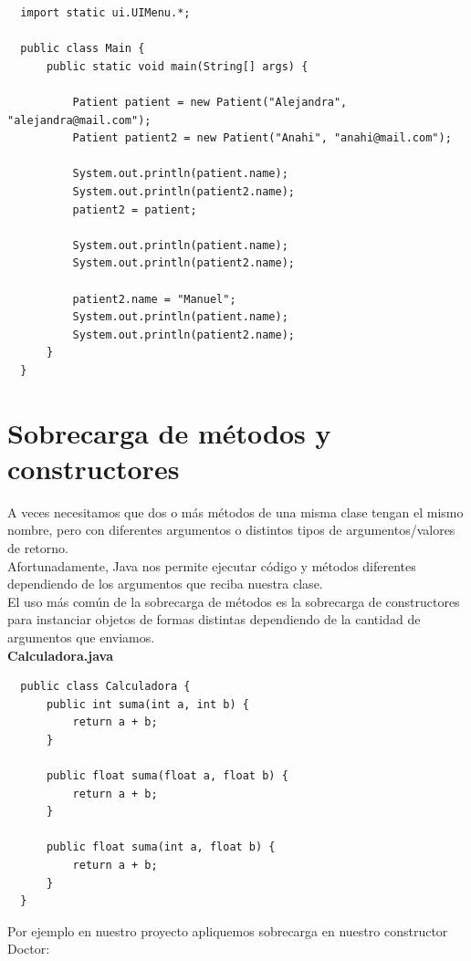 \documentclass{article}
\begin{document}
\begin{verbatim}
  import static ui.UIMenu.*;

  public class Main {
      public static void main(String[] args) {

          Patient patient = new Patient("Alejandra", "alejandra@mail.com");
          Patient patient2 = new Patient("Anahi", "anahi@mail.com");

          System.out.println(patient.name);
          System.out.println(patient2.name);
          patient2 = patient;

          System.out.println(patient.name);
          System.out.println(patient2.name);

          patient2.name = "Manuel";
          System.out.println(patient.name);
          System.out.println(patient2.name);
      }
  }
\end{verbatim}




\section{Sobrecarga de métodos y constructores}%
A veces necesitamos que dos o más métodos de una misma clase tengan el mismo
nombre, pero con diferentes argumentos o distintos tipos de argumentos/valores
de retorno.\\

Afortunadamente, Java nos permite ejecutar código y métodos diferentes
dependiendo de los argumentos que reciba nuestra clase.\\

El uso más común de la sobrecarga de métodos es la sobrecarga de constructores
para instanciar objetos de formas distintas dependiendo de la cantidad de
argumentos que enviamos.\\

\textbf{Calculadora.java}
\begin{verbatim}
  public class Calculadora {
      public int suma(int a, int b) {
          return a + b;
      }

      public float suma(float a, float b) {
          return a + b;
      }

      public float suma(int a, float b) {
          return a + b;
      }
  }
\end{verbatim}

Por ejemplo en nuestro proyecto apliquemos sobrecarga en nuestro constructor Doctor:
\end{document}
